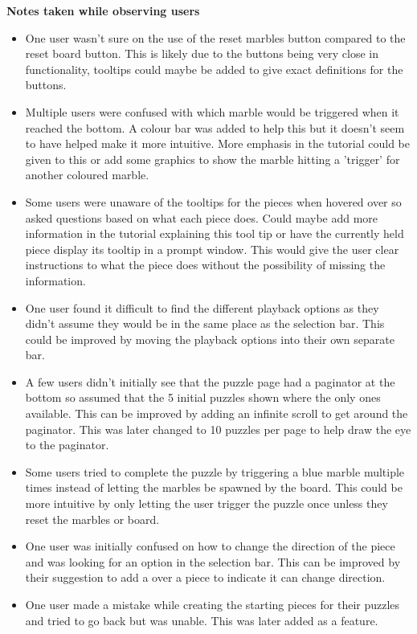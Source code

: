 \documentclass{l4proj}
\begin{document}
\textbf{Notes taken while observing users}
\begin{itemize}
    \item One user wasn't sure on the use of the reset marbles button compared to the reset board button. This is likely due to the buttons being very close in functionality, tooltips could maybe be added to give exact definitions for the buttons.
    \item Multiple users were confused with which marble would be triggered when it reached the bottom. A colour bar was added to help this but it doesn't seem to have helped make it more intuitive. More emphasis in the tutorial could be given to this or add some graphics to show the marble hitting a 'trigger' for another coloured marble.
    \item Some users were unaware of the tooltips for the pieces when hovered over so asked questions based on what each piece does. Could maybe add more information in the tutorial explaining this tool tip or have the currently held piece display its tooltip in a prompt window. This would give the user clear instructions to what the piece does without the possibility of missing the information.
    \item One user found it difficult to find the different playback options as they didn't assume they would be in the same place as the selection bar. This could be improved by moving the playback options into their own separate bar.
    \item A few users didn't initially see that the puzzle page had a paginator at the bottom so assumed that the 5 initial puzzles shown where the only ones available. This can be improved by adding an infinite scroll to get around the paginator. This was later changed to 10 puzzles per page to help draw the eye to the paginator.
    \item Some users tried to complete the puzzle by triggering a blue marble multiple times instead of letting the marbles be spawned by the board. This could be more intuitive by only letting the user trigger the puzzle once unless they reset the marbles or board.
    \item One user was initially confused on how to change the direction of the piece and was looking for an option in the selection bar. This can be improved by their suggestion to add a over a piece to indicate it can change direction.
    \item One user made a mistake while creating the starting pieces for their puzzles and tried to go back but was unable. This was later added as a feature.
\end{itemize}
\end{document}

